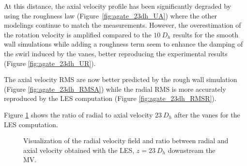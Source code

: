 \npar

At this distance, the axial velocity profile has been significantly degraded by using the roughness law (Figure\ \ref{fig:agate_23dh_UA}) where the other modelings continue to match the measurements. However, the overestimation of the rotation velocity is amplified compared to the $10\ D_{h}$ results for the smooth wall simulations while adding a roughness term seem to enhance the damping of the swirl induced by the vanes, better reproducing the experimental results (Figure \ref{fig:agate_23dh_UR}).

\npar

The axial velocity RMS are now better predicted by the rough wall simulation (Figure \ref{fig:agate_23dh_RMSA}) while the radial RMS is more accurately reproduced by the LES computation (Figure \ref{fig:agate_23dh_RMSR}). 


\npar

Figure \ref{fig:ur_s_ua_44dh} shows the ratio of radial to axial velocity $23~D_{h}$ after the vanes for the LES computation.

\begin{figure}
\caption{Visualization of the radial velocity field and ratio between radial and axial velocity obtained with the LES, $z=23~D_{h}$ downstream the MV.}
\label{fig:ur_s_ua_44dh}
\end{figure}



